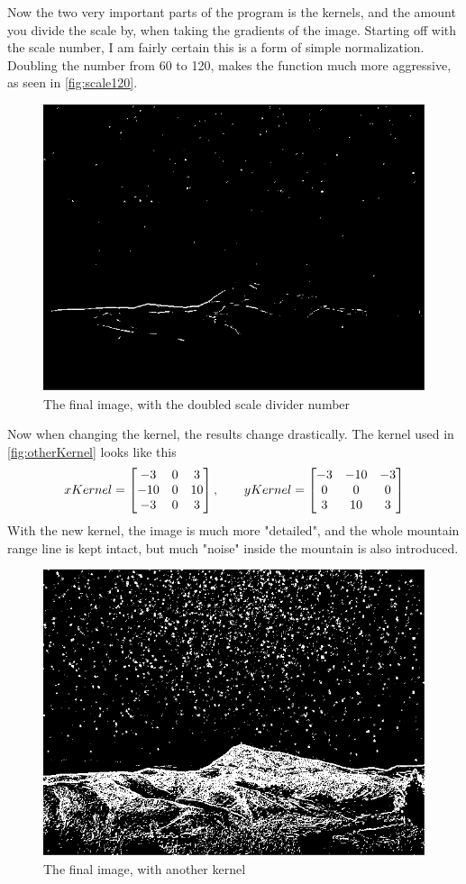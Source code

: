 Now the two very important parts of the program is the kernels, and the amount you divide the scale by, when taking the gradients of the image.
Starting off with the scale number, I am fairly certain this is a form of simple normalization. Doubling the number from 60 to 120, makes the function much more aggressive, as seen in \autoref{fig:scale120}.
\begin{figure}[H]
	\centering
	\includegraphics[width=0.6\linewidth]{figure/scale120}
	\caption{The final image, with the doubled scale divider number}
	\label{fig:scale120}
\end{figure}\newpage
Now when changing the kernel, the results change drastically. The kernel used in \autoref{fig:otherKernel} looks like this
\[
xKernel = 
\begin{bmatrix}
-3 & 0 & 3\\
-10 & 0 & 10\\
-3 & 0 & 3
\end{bmatrix},\hspace{0.7cm}
yKernel = 
\begin{bmatrix}
-3 & -10 & -3\\
0 & 0 & 0\\
3 & 10 & 3
\end{bmatrix}
\]
With the new kernel, the image is much more "detailed", and the whole mountain range line is kept intact, but much "noise" inside the mountain is also introduced.
\begin{figure}[H]
	\centering
	\includegraphics[width=0.7\linewidth]{figure/otherKernel}
	\caption{The final image, with another kernel}
	\label{fig:otherKernel}
\end{figure}